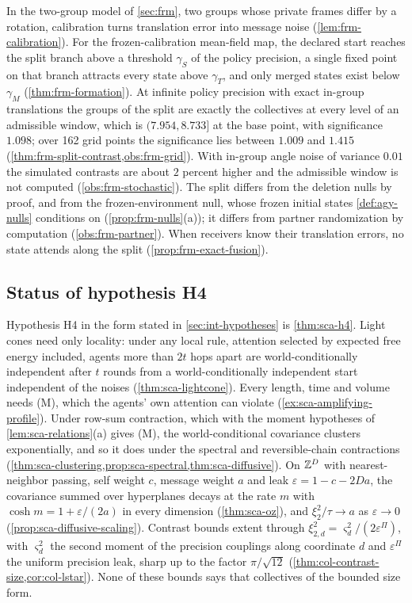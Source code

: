 In the two-group model of \cref{sec:frm}, two groups whose private frames differ by a rotation, calibration turns translation error into message noise (\cref{lem:frm-calibration}). For the frozen-calibration mean-field map, the declared start reaches the split branch above a threshold $\gamma_S$ of the policy precision, a single fixed point on that branch attracts every state above $\gamma_T$, and only merged states exist below $\gamma_M$ (\cref{thm:frm-formation}). At infinite policy precision with exact in-group translations the groups of the split are exactly the collectives at every level of an admissible window, which is $(7.954,8.733]$ at the base point, with significance $1.098$; over 162 grid points the significance lies between $1.009$ and $1.415$ (\cref{thm:frm-split-contrast,obs:frm-grid}). With in-group angle noise of variance $0.01$ the simulated contrasts are about $2$ percent higher and the admissible window is not computed (\cref{obs:frm-stochastic}). The split differs from the deletion nulls by proof, and from the frozen-environment null, whose frozen initial states \cref{def:agy-nulls} conditions on (\cref{prop:frm-nulls}(a)); it differs from partner randomization by computation (\cref{obs:frm-partner}). When receivers know their translation errors, no state attends along the split (\cref{prop:frm-exact-fusion}).

\subsection{Status of hypothesis H4}\label{sup:int-status-of-hypothesis-h4}

Hypothesis H4 in the form stated in \cref{sec:int-hypotheses} is \cref{thm:sca-h4}. Light cones need only locality: under any local rule, attention selected by expected free energy included, agents more than $2t$ hops apart are world-conditionally independent after $t$ rounds from a world-conditionally independent start independent of the noises (\cref{thm:sca-lightcone}). Every length, time and volume needs (M), which the agents' own attention can violate (\cref{ex:sca-amplifying-profile}). Under row-sum contraction, which with the moment hypotheses of \cref{lem:sca-relations}(a) gives (M), the world-conditional covariance clusters exponentially, and so it does under the spectral and reversible-chain contractions (\cref{thm:sca-clustering,prop:sca-spectral,thm:sca-diffusive}). On $\mathbb{Z}^D$ with nearest-neighbor passing, self weight $c$, message weight $a$ and leak $\varepsilon=1-c-2Da$, the covariance summed over hyperplanes decays at the rate $m$ with $\cosh m=1+\varepsilon/(2a)$ in every dimension (\cref{thm:sca-oz}), and $\xi_2^2/\tau\to a$ as $\varepsilon\to0$ (\cref{prop:sca-diffusive-scaling}). Contrast bounds extent through $\xi_{2,d}^2=\varsigma_d^2/(2\varepsilon^\Pi)$, with $\varsigma_d^2$ the second moment of the precision couplings along coordinate $d$ and $\varepsilon^\Pi$ the uniform precision leak, sharp up to the factor $\pi/\sqrt{12}$ (\cref{thm:col-contrast-size,cor:col-lstar}). None of these bounds says that collectives of the bounded size form.

